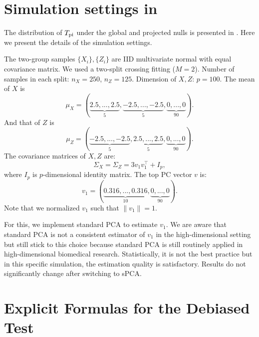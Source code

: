 \documentclass[11pt]{article}
\begin{document}
\vspace{2em}

\appendix
\renewcommand\thefigure{\thesection.\arabic{figure}}    
\section{Simulation settings in }
\label{app: for the figure}
The distribution of $T_{\rm pi}$ under the global and projected nulls is presented in . Here we present the details of the simulation settings.

The two-group samples $\{X_i\}, \{Z_i\}$ are IID multivariate normal with equal covariance matrix. We used a two-split crossing fitting ($M=2$). Number of samples in each split: $n_X = 250$, $n_Z = 125$. Dimension of $X,Z$: $p = 100$. The mean of $X$ is
\begin{equation*}
    \mu_X = (\underbrace{2.5,...,2.5}_{5}, \underbrace{-2.5,...,-2.5}_{5}, \underbrace{0,...,0}_{90}).
\end{equation*}
And that of $Z$ is 
\begin{equation*}
    \mu_Z = (\underbrace{-2.5,...,-2.5}_{5}, \underbrace{2.5,...,2.5}_{5}, \underbrace{0,...,0}_{90}).
\end{equation*}
The covariance matrices of $X,Z$ are:
\begin{equation*}
    \Sigma_X = \Sigma_Z = 3v_1v_1^\top+I_p,
\end{equation*}
where $I_p$ is $p$-dimensional identity matrix. The top PC vector $v$ is:
\begin{equation*}
    v_1 = (\underbrace{0.316, ..., 0.316}_{10},\underbrace{0,...,0}_{90}).
\end{equation*}
Note that we normalized $v_1$ such that $\|v_1\| = 1$.

For this, we implement standard PCA to estimate $v_1$. We are aware that standard PCA is not a consistent estimator of $v_1$ in the high-dimensional setting but still stick to this choice because standard PCA is still routinely applied in high-dimensional biomedical research. Statistically, it is not the best practice but in this specific simulation, the estimation quality is satisfactory. Results do not significantly change after switching to sPCA.

\section{Explicit Formulas for the Debiased Test}\label{app: explicit formula}
\end{document}
